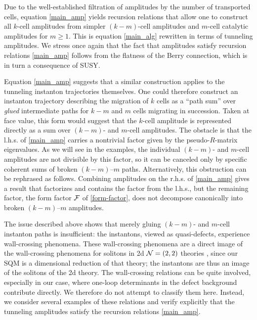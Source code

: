 \documentclass[10pt]{article}
\theoremstyle{definition}
\def\CF {{\cal F}}
\def\CN {{\cal N}}
\numberwithin{equation}{section}
\begin{document}
Due to the well-established filtration of amplitudes by the number of transported cells, equation \eqref{main_amp} yields recursion relations that allow one to construct all $k$-cell amplitudes from simpler $(k-m)$-cell amplitudes and $m$-cell catalytic amplitudes for $m\geq 1$.
This is equation \eqref{main_alg} rewritten in terms of tunneling amplitudes.
We stress once again that the fact that amplitudes satisfy recursion relations \eqref{main_amp} follows from the flatness of the Berry connection, which is in turn a consequence of SUSY.

Equation \eqref{main_amp} suggests that a similar construction applies to the tunneling instanton trajectories themselves.
One could therefore construct an instanton trajectory describing the migration of $k$ cells as a ``path sum'' over \emph{glued} intermediate paths for $k-m$ and $m$ cells migrating in succession.
Taken at face value, this form would suggest that the $k$-cell amplitude is represented directly as a sum over $(k-m)$- and $m$-cell amplitudes.
The obstacle is that the l.h.s. of \eqref{main_amp} carries a nontrivial factor given by the pseudo-$R$-matrix eigenvalues.
As we will see in the examples, the individual $(k-m)$- and $m$-cell amplitudes are not divisible by this factor, so it can be canceled only by specific coherent sums of broken $(k-m)$--$m$ paths.
Alternatively, this obstruction can be rephrased as follows.
Combining amplitudes on the r.h.s. of \eqref{main_amp} gives a result that factorizes and contains the factor from the l.h.s., but the remaining factor, the form factor $\CF$ of \eqref{form-factor}, does not decompose canonically into broken $(k-m)$--$m$ amplitudes.

The issue described above shows that merely gluing $(k-m)$- and $m$-cell instanton paths is insufficient: the instantons, viewed as quasi-defects, experience wall-crossing phenomena.
These wall-crossing phenomena are a direct image of the wall-crossing phenomena for solitons in 2d $\CN=(2,2)$ theories \cite{Kontsevich:2008fj,Cecotti:2010Rtwist,Gaiotto:2011tf,Gaiotto:2012rg,Herbst:2008jq,Hori:2013ika,Gaiotto:2015aoa,Galakhov:2020upa,Brunner:2021ulc,Aganagic:2009OpenBPS,Khan:2020Categorical,Khan:2024yiy}, since our SQM is a dimensional reduction of that theory; the instantons are thus an image of the solitons of the 2d theory.
The wall-crossing relations can be quite involved, especially in our case, where one-loop determinants in the defect background contribute directly.
We therefore do not attempt to classify them here.
Instead, we consider several examples of these relations and verify explicitly that the tunneling amplitudes satisfy the recursion relations \eqref{main_amp}.
\end{document}
